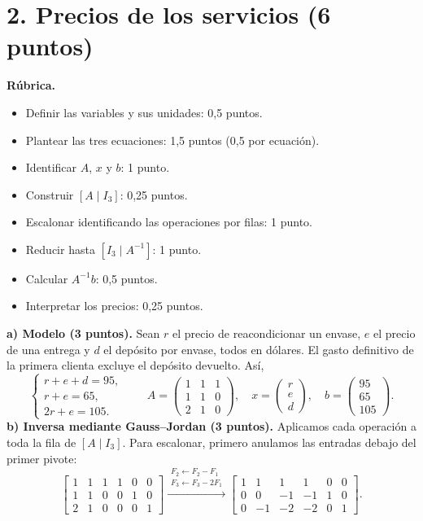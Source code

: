 \documentclass[10pt,a4]{examenEPN0}
\begin{document}
\section*{2. Precios de los servicios (6 puntos)}
\noindent\textbf{Rúbrica.}
\begin{itemize}[itemsep=2pt]
    \item Definir las variables y sus unidades: 0,5 puntos.
    \item Plantear las tres ecuaciones: 1,5 puntos (0,5 por ecuación).
    \item Identificar $A$, $x$ y $b$: 1 punto.
    \item Construir $[A\mid I_3]$: 0,25 puntos.
    \item Escalonar identificando las operaciones por filas: 1 punto.
    \item Reducir hasta $[I_3\mid A^{-1}]$: 1 punto.
    \item Calcular $A^{-1}b$: 0,5 puntos.
    \item Interpretar los precios: 0,25 puntos.
\end{itemize}
\noindent\textbf{a) Modelo (3 puntos).}
Sean $r$ el precio de reacondicionar un envase, $e$ el precio de una entrega
y $d$ el depósito por envase, todos en dólares. El gasto definitivo de la
primera clienta excluye el depósito devuelto. Así,
\[
    \begin{cases}r+e+d=95,\\r+e=65,\\2r+e=105.\end{cases}
    \qquad
    A=\begin{pmatrix}1&1&1\\1&1&0\\2&1&0\end{pmatrix},\quad
    x=\begin{pmatrix}r\\e\\d\end{pmatrix},\quad
    b=\begin{pmatrix}95\\65\\105\end{pmatrix}.
\]
\noindent\textbf{b) Inversa mediante Gauss--Jordan (3 puntos).}
Aplicamos cada operación a toda la fila de $[A\mid I_3]$.
Para escalonar, primero anulamos las entradas debajo del primer pivote:
\[
    \left[\begin{array}{ccc|ccc}
        1&1&1&1&0&0\\1&1&0&0&1&0\\2&1&0&0&0&1
    \end{array}\right]
    \xrightarrow{\substack{F_2\leftarrow F_2-F_1\\F_3\leftarrow F_3-2F_1}}
    \left[\begin{array}{ccc|ccc}
        1&1&1&1&0&0\\0&0&-1&-1&1&0\\0&-1&-2&-2&0&1
    \end{array}\right].
\]
\end{document}
